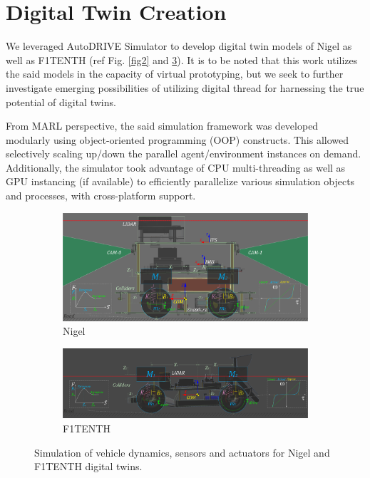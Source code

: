 \documentclass[letterpaper, 10 pt, conference]{ieeeconf}  %
\begin{document}
	
	\section{Digital Twin Creation}
	\label{Section: Digital Twin Creation}
	
	We leveraged AutoDRIVE Simulator \cite{AutoDRIVESimulator2021, AutoDRIVESimulatorReport2020} to develop digital twin models of Nigel as well as F1TENTH (ref Fig. \ref{fig2} and \ref{fig3}). It is to be noted that this work utilizes the said models in the capacity of virtual prototyping, but we seek to further investigate emerging possibilities of utilizing digital thread for harnessing the true potential of digital twins.
	
	From MARL perspective, the said simulation framework was developed modularly using object-oriented programming (OOP) constructs. This allowed selectively scaling up/down the parallel agent/environment instances on demand. Additionally, the simulator took advantage of CPU multi-threading as well as GPU instancing (if available) to efficiently parallelize various simulation objects and processes, with cross-platform support.
	
	\begin{figure}[t]
		\centering
		\begin{subfigure}[b]{\linewidth}
			\centering
			\includegraphics[width=\linewidth]{Fig3a.png}
			\caption{Nigel}
			\label{fig3a}
		\end{subfigure}
		\hfill
		\begin{subfigure}[b]{\linewidth}
			\centering
			\includegraphics[width=\linewidth]{Fig3b.png}
			\caption{F1TENTH}
			\label{fig3b}
		\end{subfigure}
		\caption{Simulation of vehicle dynamics, sensors and actuators for Nigel and F1TENTH digital twins.}
		\label{fig3}
	\end{figure}
	
\end{document}
